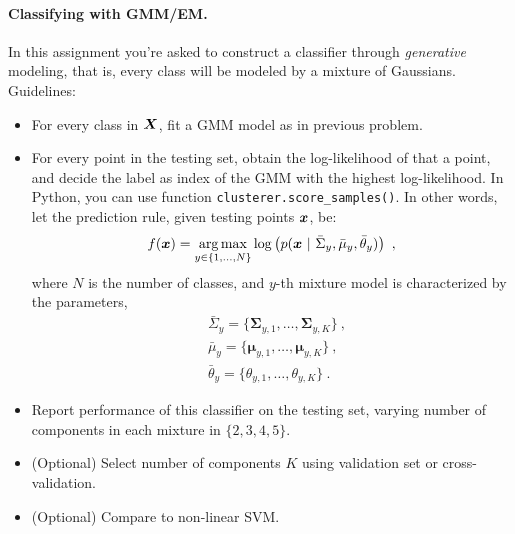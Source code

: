 \documentclass{article}
\begin{document}
\paragraph{Classifying with GMM/EM.}
In this assignment you're asked to construct a classifier through \emph{generative} modeling, that is, every class will be modeled by a mixture of Gaussians.
Guidelines:
\begin{itemize}
\item For every class in $\boldsymbol{X}$, fit a GMM model as in previous problem. %
\item For every point in the testing set, obtain the log-likelihood of that a point, and decide the label as index of the GMM with the highest log-likelihood.
In Python, you can use function \verb!clusterer.score_samples()!.
In other words, let the prediction rule, given testing points $\boldsymbol{x}$, be:
\[
f(\boldsymbol{x}) = \operatorname*{arg\,max}_{y \in \{1, \ldots, N\}} \log\left(p(\boldsymbol{x} \ | \ \bar{\Sigma}_y, \bar{\mu}_y, \bar{\theta}_y) \right)~,
\]
where $N$ is the number of classes, and $y$-th mixture model is characterized by the parameters,
\begin{align*}
&\bar{\Sigma}_y = \{\boldsymbol{\Sigma}_{y,1}, \ldots, \boldsymbol{\Sigma}_{y,K}\}~, \tag{Covariances}\\
&\bar{\mu}_y = \{\boldsymbol{\mu}_{y,1}, \ldots, \boldsymbol{\mu}_{y,K}\}~, \tag{Means}\\
&\bar{\theta}_y = \{\theta_{y,1}, \ldots, \theta_{y,K}\}~. \tag{Mixture weights}
\end{align*}
\item Report performance of this classifier on the testing set, varying number of components in each mixture in $\{2, 3, 4, 5\}$.
\item (Optional) Select number of components $K$ using validation set or cross-validation.
\item (Optional) Compare to non-linear SVM.
\end{itemize}
\end{document}
